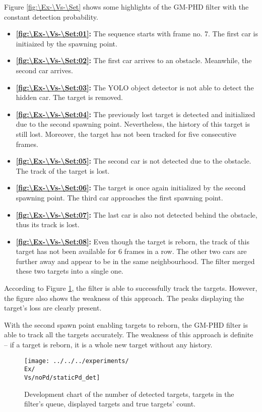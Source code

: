 Figure \ref{fig:\Ex-\Vs-\Set} shows some highlights of the GM-PHD filter with the constant detection probability.
\begin{itemize}
    \item \textbf{\ref{fig:\Ex-\Vs-\Set:01}:} The sequence starts with frame no. 7. The first car is initiaized by the spawning point.
    \item \textbf{\ref{fig:\Ex-\Vs-\Set:02}:} The first car arrives to an obstacle. Meanwhile, the second car arrives.
    \item \textbf{\ref{fig:\Ex-\Vs-\Set:03}:} The YOLO object detector is not able to detect the hidden car. The target is removed.
    \item \textbf{\ref{fig:\Ex-\Vs-\Set:04}:} The previously lost target is detected and initialized due to the
    second spawning point. Nevertheless, the history of this target is still lost. Moreover, the target has not been tracked for five consecutive frames.
    \item \textbf{\ref{fig:\Ex-\Vs-\Set:05}:} The second car is not detected due to the obstacle. The track of the target is lost.
    \item \textbf{\ref{fig:\Ex-\Vs-\Set:06}:} The target is once again initialized by the second spawning point. The
    third car approaches the first spawning point.
    \item \textbf{\ref{fig:\Ex-\Vs-\Set:07}:} The last car is also not detected behind the obstacle, thus its track is lost.
    \item \textbf{\ref{fig:\Ex-\Vs-\Set:08}:} Even though the target is reborn, the track of this target has not been
    available for 6 frames in a row. The other two cars are further away and appear to be in the same neighbourhood.
    The filter merged these two targets into a single one.
\end{itemize}

According to Figure \ref{gr:\Ex-\Vs-\Set}, the filter is able to successfully track the targets. However, the figure
also
shows the weakness of this approach. The peaks displaying the target's loss are clearly present.

With the second spawn point enabling targets to reborn, the GM-PHD filter is able to track all the targets accurately.
The weakness of this approach is definite -- if a target is reborn, it is a whole new target without any history.

\begin{figure}[H]
    \centering
    \texttt{[image: ../../../experiments/\\Ex/\\Vs/noPd/staticPd\_det]}
    \caption{Development chart of the number of detected targets, targets in the filter's queue, displayed targets and
    true targets' count.}
    \label{gr:\Ex-\Vs-\Set}
\end{figure}

